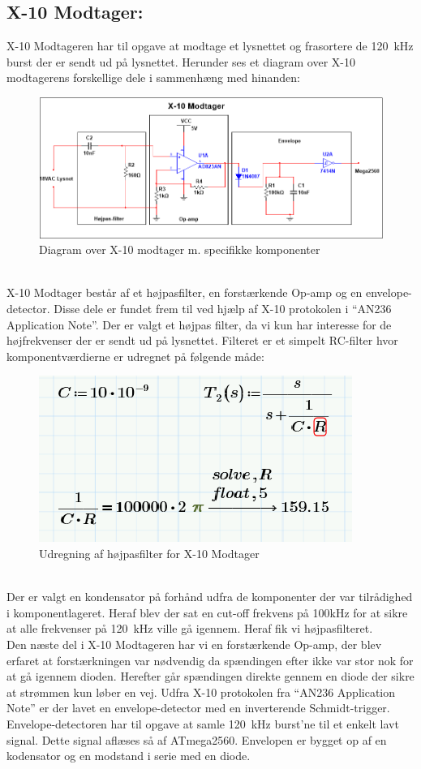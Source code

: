 \documentclass[11pt]{article}
\begin{document}
\subsection{X-10 Modtager: }
X-10 Modtageren har til opgave at modtage et lysnettet og frasortere de \SI{120}{\kilo\hertz} burst der er sendt ud på lysnettet. Herunder ses et diagram over X-10 modtagerens forskellige dele i sammenhæng med hinanden:
\begin{figure}[!h]
\centering
\includegraphics[scale = 0.7]{X-10modtager}
\caption{Diagram over X-10 modtager m. specifikke komponenter}
\end{figure}\\
X-10 Modtager består af et højpasfilter, en forstærkende Op-amp og en envelope-detector. Disse dele er fundet frem til ved hjælp af X-10 protokolen i ``AN236 Application Note''. Der er valgt et højpas filter, da vi kun har interesse for de højfrekvenser der er sendt ud på lysnettet. Filteret er et simpelt RC-filter hvor komponentværdierne er udregnet på følgende måde:
\begin{figure}[!h]
\centering
\includegraphics[scale = 0.8]{Hojspas-modtager}
\caption{Udregning af højpasfilter for X-10 Modtager}
\end{figure}\\
Der er valgt en kondensator på forhånd udfra de komponenter der var tilrådighed i komponentlageret. Heraf blev der sat en cut-off frekvens på 100kHz for at sikre at alle frekvenser på \SI{120}{\kilo\hertz} ville gå igennem. Heraf fik vi højpasfilteret. \\
Den næste del i X-10 Modtageren har vi en forstærkende Op-amp, der blev erfaret at forstærkningen var nødvendig da spændingen efter ikke var stor nok for at gå igennem dioden. Herefter går spændingen direkte gennem en diode der sikre at strømmen kun løber en vej. Udfra X-10 protokolen fra ``AN236 Application Note'' er der lavet en envelope-detector med en inverterende Schmidt-trigger. Envelope-detectoren har til opgave at samle \SI{120}{\kilo\hertz} burst'ne til et enkelt lavt signal. Dette signal aflæses så af ATmega2560. Envelopen er bygget op af en kodensator og en modstand i serie med en diode. 
\end{document}
